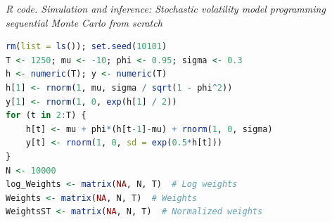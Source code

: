 \begin{tcolorbox}[enhanced,width=4.67in,center upper,
	fontupper=\large\bfseries,drop shadow southwest,sharp corners]
	\textit{R code. Simulation and inference: Stochastic volatility model programming sequential Monte Carlo from scratch}
	\begin{VF}
		\begin{lstlisting}[language=R]
rm(list = ls()); set.seed(10101)
T <- 1250; mu <- -10; phi <- 0.95; sigma <- 0.3
h <- numeric(T); y <- numeric(T)
h[1] <- rnorm(1, mu, sigma / sqrt(1 - phi^2))  
y[1] <- rnorm(1, 0, exp(h[1] / 2))           
for (t in 2:T) {
	h[t] <- mu + phi*(h[t-1]-mu) + rnorm(1, 0, sigma)
	y[t] <- rnorm(1, 0, sd = exp(0.5*h[t]))
}
N <- 10000
log_Weights <- matrix(NA, N, T)  # Log weights
Weights <- matrix(NA, N, T)  # Weights 
WeightsST <- matrix(NA, N, T)  # Normalized weights
\end{lstlisting}
	\end{VF}
\end{tcolorbox}

